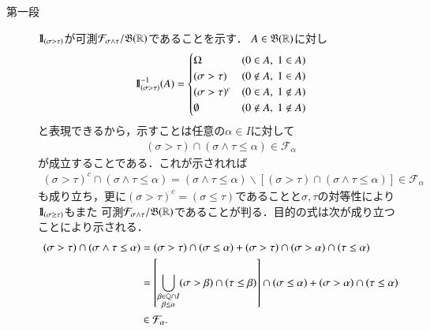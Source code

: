 	\begin{prf}\mbox{}
		\begin{description}
			\item[第一段] $\mbox{1}\hspace{-0.25em}\mbox{l}_{(\sigma > \tau)}$が可測$\mathcal{F}_{\sigma \wedge \tau}/\mathfrak{B}(\mathbb{R})$であることを示す．
				$A \in \mathfrak{B}(\mathbb{R})$に対し
				\begin{align}
					\mbox{1}\hspace{-0.25em}\mbox{l}_{(\sigma > \tau)}^{-1}(A) = 
					\begin{cases}
						\Omega & (0 \in A,\ 1 \in A) \\
						(\sigma > \tau) & (0 \notin A,\ 1 \in A) \\
						(\sigma > \tau)^c & (0 \in A,\ 1 \notin A) \\
						\emptyset & (0 \notin A,\ 1 \notin A)
					\end{cases}
				\end{align}
				と表現できるから，示すことは任意の$\alpha \in I$に対して
				\begin{align}
					(\sigma > \tau) \cap (\sigma \wedge \tau \leq \alpha) \in \mathcal{F}_\alpha
				\end{align}
				が成立することである．これが示されれば
				\begin{align}
					(\sigma > \tau)^c \cap (\sigma \wedge \tau \leq \alpha)
					= (\sigma \wedge \tau \leq \alpha) \backslash \left[(\sigma > \tau) \cap (\sigma \wedge \tau \leq \alpha)\right] \in \mathcal{F}_\alpha
				\end{align}
				も成り立ち，更に$(\sigma > \tau)^c = (\sigma \leq \tau)$であることと$\sigma,\tau$の対等性により$\mbox{1}\hspace{-0.25em}\mbox{l}_{(\sigma \geq \tau)}$もまた
				可測$\mathcal{F}_{\sigma \wedge \tau}/\mathfrak{B}(\mathbb{R})$であることが判る．目的の式は次が成り立つことにより示される．
				\begin{align}
					(\sigma > \tau) \cap (\sigma \wedge \tau \leq \alpha)
					&= (\sigma > \tau) \cap (\sigma \leq \alpha) + (\sigma > \tau) \cap (\sigma > \alpha) \cap (\tau \leq \alpha) \\
					&= \left[\bigcup_{\substack{\beta \in \mathbb{Q} \cap I \\ \beta \leq \alpha}} (\sigma > \beta)\cap(\tau \leq \beta)\right]\cap(\sigma \leq \alpha) + (\sigma > \alpha) \cap (\tau \leq \alpha)
					\label{eq:stopping_time_conditional_expectation_1} \\
					&\in \mathcal{F}_\alpha.
				\end{align}
			

\end{description}
\end{prf}
